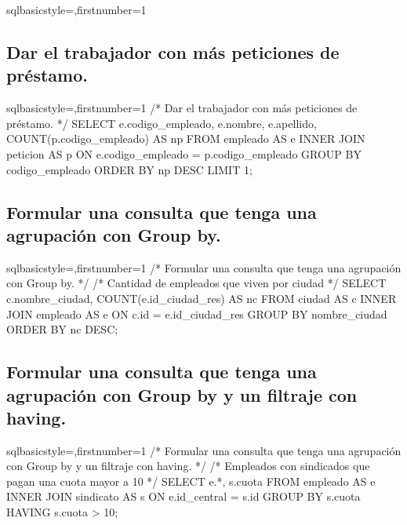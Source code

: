 \begin{sourcecodep}[]{sql}{basicstyle={\fontsize{10}{10}\selectfont\ttfamily},firstnumber=1}{}
	\subsection{Dar el trabajador con más peticiones de préstamo.}
		\begin{sourcecodep}[]{sql}{basicstyle={\fontsize{10}{10}\selectfont\ttfamily},firstnumber=1}{}
			/* Dar el trabajador con más peticiones de préstamo. */
			SELECT e.codigo_empleado, e.nombre, e.apellido, COUNT(p.codigo_empleado) AS np FROM empleado AS e
				INNER JOIN peticion AS p ON e.codigo_empleado = p.codigo_empleado
				GROUP BY codigo_empleado
				ORDER BY np DESC
				LIMIT 1;\end{sourcecodep}
\newpage
	\subsection{Formular una consulta que tenga una agrupación con Group by.}
		\begin{sourcecodep}[]{sql}{basicstyle={\fontsize{10}{10}\selectfont\ttfamily},firstnumber=1}{}
			/* Formular una consulta que tenga una agrupación con Group by. */
			/* Cantidad de empleados que viven por ciudad */
			SELECT c.nombre_ciudad, COUNT(e.id_ciudad_res) AS nc FROM ciudad AS c
				INNER JOIN empleado AS e ON c.id = e.id_ciudad_res
				GROUP BY nombre_ciudad
				ORDER BY nc DESC;\end{sourcecodep}
	\subsection{Formular una consulta que tenga una agrupación con Group by y un filtraje con having.}
		\begin{sourcecodep}[]{sql}{basicstyle={\fontsize{10}{10}\selectfont\ttfamily},firstnumber=1}{}
			/* Formular una consulta que tenga una agrupación con Group by y un filtraje con having. */
			/* Empleados con sindicados que pagan una cuota mayor a 10 */
			SELECT e.*, s.cuota FROM empleado AS e
				INNER JOIN sindicato AS s ON e.id_central = s.id
				GROUP BY s.cuota
				HAVING s.cuota > 10;\end{sourcecodep}

\end{sourcecodep}
